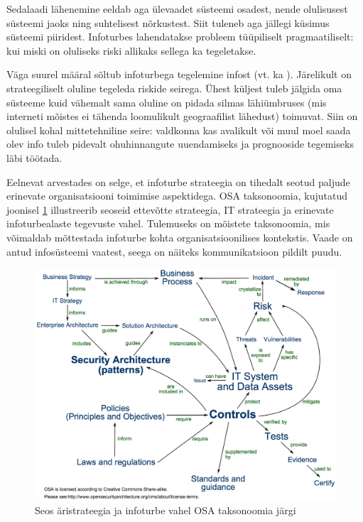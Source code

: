\documentclass{tufte-book}
\begin{document}
Sedalaadi lähenemine eeldab aga ülevaadet süsteemi osadest, nende olulisusest süsteemi jaoks ning suhtelisest nõrkustest. Siit tuleneb aga jällegi küsimus süsteemi piiridest. Infoturbes lahendatakse probleem tüüpiliselt pragmaatiliselt: kui miski on oluliseks riski allikaks sellega ka tegeletakse.

Väga suurel määral sõltub infoturbega tegelemine infost (vt. ka ). Järelikult on strateegiliselt oluline tegeleda riskide seirega. Ühest küljest tuleb jälgida oma süsteeme kuid vähemalt sama oluline on pidada silmas lähiümbruses (mis interneti mõistes ei tähenda loomulikult geograafilist lähedust) toimuvat. Siin on olulisel kohal mittetehniline seire: valdkonna kas avalikult või muul moel saada olev info tuleb pidevalt ohuhinnangute uuendamiseks ja prognooside tegemiseks läbi töötada. 

Eelnevat arvestades on selge, et infoturbe strateegia on tihedalt seotud paljude erinevate organisatsiooni toimimise aspektidega. OSA taksonoomia, kujutatud joonisel \ref{fig:osa} illustreerib seoseid ettevõtte strateegia, IT strateegia ja erinevate infoturbealaste tegevuste vahel. Tulemuseks on mõistete taksonoomia, mis võimaldab mõttestada infoturbe kohta organisatsioonilises kontekstis. Vaade on antud infosüsteemi vaatest, seega on näiteks kommunikatsioon pildilt puudu. 

\begin{figure}[h]
	\includegraphics[width=\linewidth]{osa.png}%
	\caption{Seos äristrateegia ja infoturbe vahel OSA taksonoomia järgi} 
	\label{fig:osa}
\end{figure}
\end{document}
